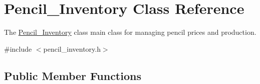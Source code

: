 \hypertarget{classPencil__Inventory}{}\section{Pencil\+\_\+\+Inventory Class Reference}
\label{classPencil__Inventory}


The \mbox{\hyperlink{classPencil__Inventory}{Pencil\+\_\+\+Inventory}} class main class for managing pencil prices and production.  




{\ttfamily \#include $<$pencil\+\_\+inventory.\+h$>$}

\subsection*{Public Member Functions}
